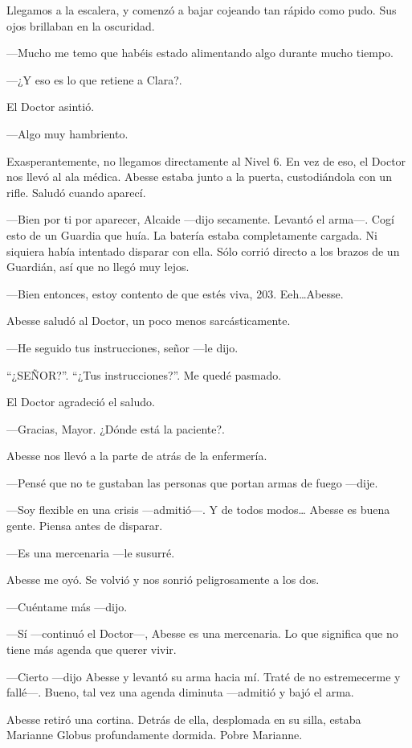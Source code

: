 Llegamos a la escalera, y comenzó a bajar cojeando tan rápido como pudo.
Sus ojos brillaban en la oscuridad.

---Mucho me temo que habéis estado alimentando algo durante mucho
tiempo.

---¿Y eso es lo que retiene a Clara?.

El Doctor asintió.

---Algo muy hambriento.

Exasperantemente, no llegamos directamente al Nivel 6. En vez de eso, el
Doctor nos llevó al ala médica. Abesse estaba junto a la puerta,
custodiándola con un rifle. Saludó cuando aparecí.

---Bien por ti por aparecer, Alcaide ---dijo secamente. Levantó el
arma---. Cogí esto de un Guardia que huía. La batería estaba
completamente cargada. Ni siquiera había intentado disparar con ella.
Sólo corrió directo a los brazos de un Guardián, así que no llegó muy
lejos.

---Bien entonces, estoy contento de que estés viva, 203.
Eeh\ldots{}Abesse.

Abesse saludó al Doctor, un poco menos sarcásticamente.

---He seguido tus instrucciones, señor ---le dijo.

``¿SEÑOR?''. ``¿Tus instrucciones?''. Me quedé pasmado.

El Doctor agradeció el saludo.

---Gracias, Mayor. ¿Dónde está la paciente?.

Abesse nos llevó a la parte de atrás de la enfermería.

---Pensé que no te gustaban las personas que portan armas de fuego
---dije.

---Soy flexible en una crisis ---admitió---. Y de todos modos\ldots{}
Abesse es buena gente. Piensa antes de disparar.

---Es una mercenaria ---le susurré.

Abesse me oyó. Se volvió y nos sonrió peligrosamente a los dos.

---Cuéntame más ---dijo.

---Sí ---continuó el Doctor---, Abesse es una mercenaria. Lo que
significa que no tiene más agenda que querer vivir.

---Cierto ---dijo Abesse y levantó su arma hacia mí. Traté de no
estremecerme y fallé---. Bueno, tal vez una agenda diminuta ---admitió y
bajó el arma.

Abesse retiró una cortina. Detrás de ella, desplomada en su silla,
estaba Marianne Globus profundamente dormida. Pobre Marianne.

